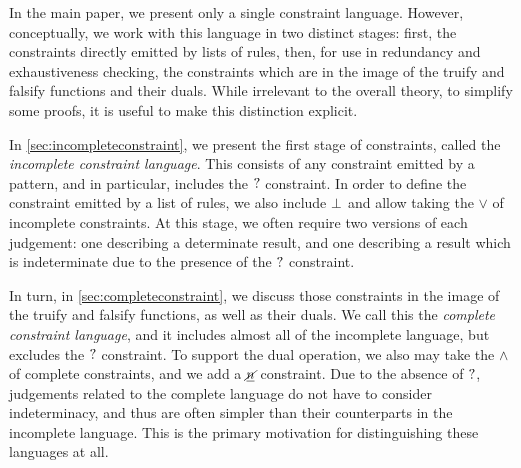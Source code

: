 \documentclass{article}
\begin{document}
In the main paper, we present only a single constraint language. However, conceptually, we work with this language in two distinct stages: first, the constraints directly emitted by lists of rules, then, for use in redundancy and exhaustiveness checking, the constraints which are in the image of the truify and falsify functions and their duals. While irrelevant to the overall theory, to simplify some proofs, it is useful to make this distinction explicit.

In \autoref{sec:incompleteconstraint}, we present the first stage of constraints, called the \emph{incomplete constraint language}. This consists of any constraint emitted by a pattern, and in particular, includes the $\mathtt{?}$ constraint. In order to define the constraint emitted by a list of rules, we also include $\bot$ and allow taking the $\vee$ of incomplete constraints. At this stage, we often require two versions of each judgement: one describing a determinate result, and one describing a result which is indeterminate due to the presence of the $\mathtt{?}$ constraint.

In turn, in \autoref{sec:completeconstraint}, we discuss those constraints in the image of the truify and falsify functions, as well as their duals. We call this the \emph{complete constraint language}, and it includes almost all of the incomplete language, but excludes the $\mathtt{?}$ constraint. To support the dual operation, we also may take the $\wedge$ of complete constraints, and we add a $\underline{\cancel{n}}$ constraint. Due to the absence of $\mathtt{?}$, judgements related to the complete language do not have to consider indeterminacy, and thus are often simpler than their counterparts in the incomplete language. This is the primary motivation for distinguishing these languages at all.



\pagebreak



\end{document}

